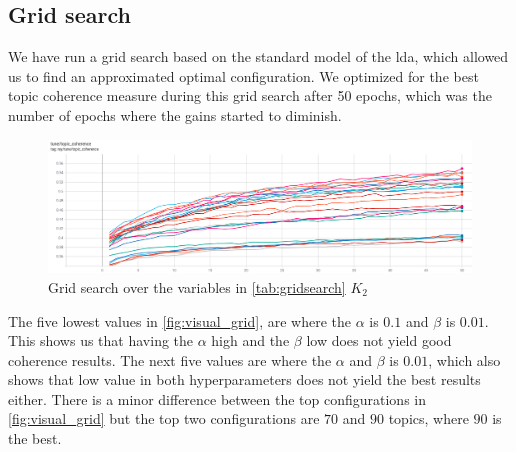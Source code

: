 \subsection{Grid search}
We have run a grid search based on the standard model of the \gls{lda}, which allowed us to find an approximated optimal configuration.
We optimized for the best topic coherence measure during this grid search after 50 epochs, which was the number of epochs where the gains started to diminish.
\begin{figure}
	\includegraphics[width=\textwidth]{figures/gridsearch.png}
	\caption{Grid search over the variables in \autoref{tab:gridsearch} $K_2$}
	\label{fig:visual_grid}
\end{figure} 
The five lowest values in \autoref{fig:visual_grid}, are where the $\alpha$ is $0.1$ and $\beta$ is $0.01$. 
This shows us that having the $\alpha$ high and the $\beta$ low does not yield good coherence results.
The next five values are where the $\alpha$ and $\beta$ is $0.01$, which also shows that low value in both hyperparameters does not yield the best results either.
There is a minor difference between the top configurations in \autoref{fig:visual_grid} but the top two configurations are $70$ and $90$ topics, where $90$ is the best.
